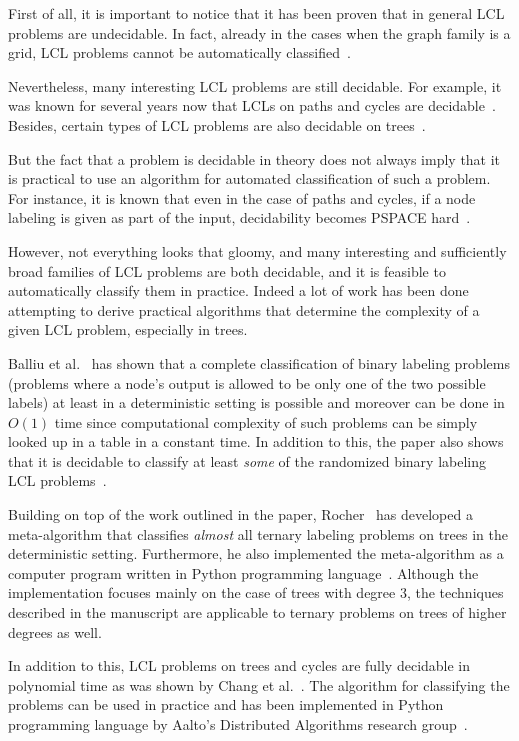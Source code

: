 First of all, it is important to notice that it has been
proven that in general LCL problems are undecidable.
In fact, already in the cases when the graph family is a grid,
LCL problems cannot be automatically classified~\cite{Brandt2017, Naor1993}.

Nevertheless, many interesting LCL problems are still decidable.
For example, it was known for several years now that LCLs
on paths and cycles are decidable~\cite{Balliu2018, Brandt2017, Naor1993}.
Besides, certain types of LCL problems are also decidable on
trees~\cite{Chang2017}.

But the fact that a problem is decidable in theory does not
always imply that it is practical to use an
algorithm for automated classification of
such a problem. For instance, it is known that even in
the case of paths and cycles, if a node labeling is
given as part of the input, decidability becomes
PSPACE hard~\cite{Balliu2018}.

However, not everything looks that gloomy, and many
interesting and sufficiently broad families of LCL
problems are both decidable, and it is feasible to
automatically classify them in practice. Indeed a lot of work
has been done attempting to derive practical algorithms
that determine the complexity of a given LCL problem,
especially in trees.

Balliu et al.~\cite{Balliu2019c} has shown that a complete classification
of binary labeling problems (problems where a node's
output is allowed to be only one of the two possible labels)
at least in a deterministic setting is possible and moreover
can be done in $O(1)$ time since computational
complexity of such problems can be simply looked up in a
table in a constant time. In addition
to this, the paper also shows that it is decidable to
classify at least \emph{some} of the randomized binary labeling
LCL problems~\cite{Balliu2019c}.

Building on top of the work outlined in the paper, Rocher~\cite{Rocher2020clas}
has developed a meta-algorithm that classifies \emph{almost}
all ternary labeling problems on trees in the deterministic
setting. Furthermore,
he also implemented the meta-algorithm as a
computer program written in Python programming language~\cite{Rocher2020doc}.
Although the implementation focuses mainly on the case of trees with degree 3,
the techniques described in the manuscript are applicable to ternary problems
on trees of higher degrees as well.

In addition to this, LCL problems on trees and cycles
are fully decidable in polynomial time as was shown by Chang et al.~\cite{Chang2020}.
The algorithm for classifying the problems can be used in practice and has
been implemented in Python programming language by Aalto's
Distributed Algorithms research group~\cite{Tereshchenko2020}.

